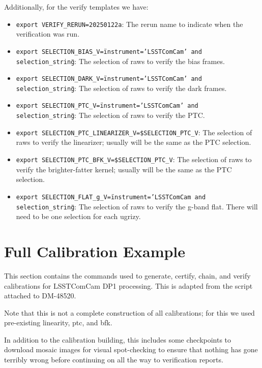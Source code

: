 \documentclass[DM,authoryear,toc]{lsstdoc}
\begin{document}
Additionally, for the verify templates we have:

\begin{itemize}
\item{\texttt{export VERIFY\_RERUN=20250122a}: The rerun name to indicate when the verification was run.}
\item{\texttt{export SELECTION\_BIAS\_V=\"instrument='LSSTComCam' and selection\_string\"}: The selection of raws to verify the bias frames.}
\item{\texttt{export SELECTION\_DARK\_V=\"instrument='LSSTComCam' and selection\_string\"}: The selection of raws to verify the dark frames.}
\item{\texttt{export SELECTION\_PTC\_V=\"instrument='LSSTComCam' and selection\_string\"}: The selection of raws to verify the PTC.}
\item{\texttt{export SELECTION\_PTC\_LINEARIZER\_V=\$SELECTION\_PTC\_V}: The selection of raws to verify the linearizer; usually will be the same as the PTC selection.}
\item{\texttt{export SELECTION\_PTC\_BFK\_V=\$SELECTION\_PTC\_V}: The selection of raws to verify the brighter-fatter kernel; usually will be the same as the PTC selection.}
\item{\texttt{export SELECTION\_FLAT\_g\_V=\"instrument='LSSTComCam and selection\_string\"}: The selection of raws to verify the g-band flat. There will need to be one selection for each ugrizy.}
\end{itemize}

\section{Full Calibration Example}
\label{sec:example}

This section contains the commands used to generate, certify, chain, and verify calibrations for LSSTComCam DP1 processing.
This is adapted from the script attached to DM-48520.

Note that this is not a complete construction of all calibrations; for this we used pre-existing linearity, ptc, and bfk.

In addition to the calibration building, this includes some checkpoints to download mosaic images for visual spot-checking to ensure that nothing has gone terribly wrong before continuing on all the way to verification reports.
\end{document}
